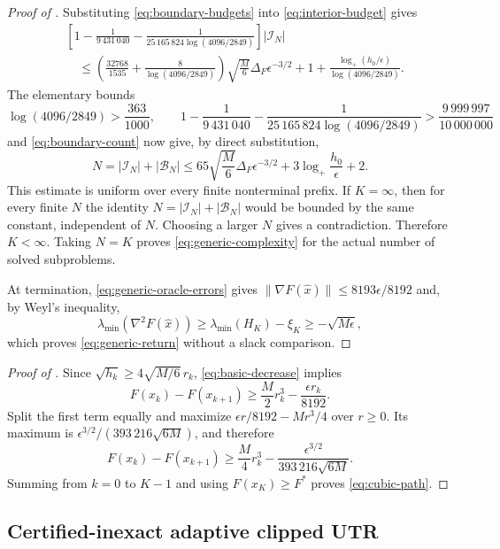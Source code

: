 \documentclass{article}
\begin{document}
\begin{proof}[Proof of ]
Substituting \eqref{eq:boundary-budgets} into
\eqref{eq:interior-budget} gives
\begin{align*}
&\left[1-\frac1{9\,431\,040}
  -\frac1{25\,165\,824\log(4096/2849)}\right]
  |\mathcal I_N|\\
&\quad\le
\left(\frac{32768}{1535}
      +\frac8{\log(4096/2849)}\right)
\sqrt{\frac M6}\Delta_F\epsilon^{-3/2}
+1+\frac{\log_+(h_0/\epsilon)}{\log(4096/2849)}.
\end{align*}
The elementary bounds
\[
 \log(4096/2849)>\frac{363}{1000},
 \qquad
 1-\frac1{9\,431\,040}
  -\frac1{25\,165\,824\log(4096/2849)}
  >\frac{9\,999\,997}{10\,000\,000}
\]
and \eqref{eq:boundary-count} now give, by direct substitution,
\begin{equation}\label{eq:finite-prefix-explicit}
 N=|\mathcal I_N|+|\mathcal B_N|
 \le65\sqrt{\frac M6}\Delta_F\epsilon^{-3/2}
      +3\log_+\!\frac{h_0}{\epsilon}+2.
\end{equation}
This estimate is uniform over every finite nonterminal prefix.
If $K=\infty$, then for every finite $N$ the identity
$N=|\mathcal I_N|+|\mathcal B_N|$ would be bounded by the same constant,
independent of $N$.  Choosing a larger $N$ gives a contradiction.
Therefore $K<\infty$.  Taking $N=K$ proves
\eqref{eq:generic-complexity} for the actual
number of solved subproblems.

At termination, \eqref{eq:generic-oracle-errors} gives
$\|\nabla F(\widehat x)\|\le8193\epsilon/8192$ and, by Weyl's
inequality,
\[
  \lambda_{\min}(\nabla^2F(\widehat x))
  \ge\lambda_{\min}(H_K)-\xi_K
  \ge-\sqrt{M\epsilon},
\]
which proves \eqref{eq:generic-return} without a slack comparison.
\end{proof}

\begin{proof}[Proof of ]
Since $\sqrt{h_k}\ge4\sqrt{M/6}\,r_k$,
\eqref{eq:basic-decrease} implies
\[
 F(x_k)-F(x_{k+1})
 \ge\frac M2r_k^3-\frac{\epsilon r_k}{8192}.
\]
Split the first term equally and maximize
$\epsilon r/8192-Mr^3/4$ over $r\ge0$.  Its maximum is
$\epsilon^{3/2}/(393\,216\sqrt{6M})$, and therefore
\[
 F(x_k)-F(x_{k+1})
 \ge\frac M4r_k^3
 -\frac{\epsilon^{3/2}}{393\,216\sqrt{6M}}.
\]
Summing from $k=0$ to $K-1$ and using $F(x_K)\ge F^*$ proves
\eqref{eq:cubic-path}.
\end{proof}

\subsection{Certified-inexact adaptive clipped UTR}
\end{document}
